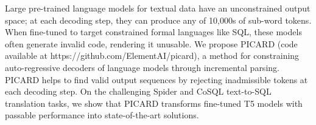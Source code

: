 Large pre-trained language models for textual data have an unconstrained output space; at each decoding step, they can produce any of 10,000s of sub-word tokens. When fine-tuned to target constrained formal languages like SQL, these models often generate invalid code, rendering it unusable. We propose PICARD (code available at https://github.com/ElementAI/picard), a method for constraining auto-regressive decoders of language models through incremental parsing. PICARD helps to find valid output sequences by rejecting inadmissible tokens at each decoding step. On the challenging Spider and CoSQL text-to-SQL translation tasks, we show that PICARD transforms fine-tuned T5 models with passable performance into state-of-the-art solutions.
